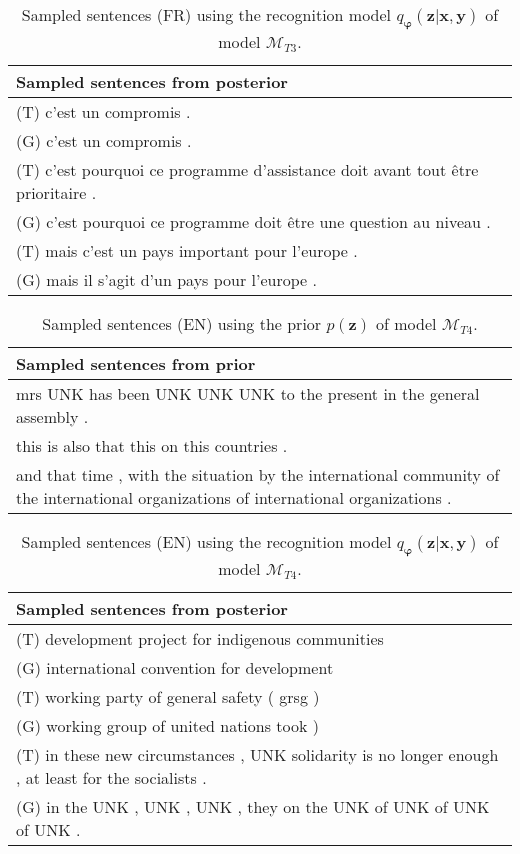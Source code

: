 \begin{table}
  \centering
  \begin{tabular}{|L{14cm}|} 
    \hline
    Sampled sentences from posterior\\ [0.5ex] 
    \hline\hline
    (T) c’est un compromis .\\
    (G) c’est un compromis .\\
    \hline
    (T) c'est pourquoi ce programme d'assistance doit avant tout être prioritaire .\\
    (G) c'est pourquoi ce programme doit être une question au niveau .\\
    \hline
    (T) mais c'est un pays important pour l'europe .\\
    (G) mais il s'agit d'un pays pour l'europe .\\
    \hline
  \end{tabular}
  \caption{Sampled sentences (FR) using the recognition model
    $q_{\bm{\varphi}}(\bm{z} | \bm{x}, \bm{y})$ of model $\mathcal{M}_{T3}$.}
\end{table}

\begin{table}
  \centering
  \begin{tabular}{|L{14cm}|} 
    \hline
    Sampled sentences from prior\\
    \hline\hline
    mrs UNK has been UNK UNK UNK to the present in the general assembly .\\
    \hline
    this is also that this on this countries .\\
    \hline
    and that time , with the situation by the international community of the international organizations of international organizations .\\
    \hline
  \end{tabular}
  \caption{Sampled sentences (EN) using the prior $p(\bm{z})$ of model $\mathcal{M}_{T4}$.}
\end{table}

\begin{table}
  \centering
  \begin{tabular}{|L{14cm}|} 
    \hline
    Sampled sentences from posterior\\ [0.5ex] 
    \hline\hline
    (T) development project for indigenous communities\\
    (G) international convention for development\\
    \hline
    (T) working party of general safety ( grsg )\\
    (G) working group of united nations took )\\
    \hline
    (T) in these new circumstances , UNK solidarity is no longer enough , at least for the socialists .\\
    (G) in the UNK , UNK , UNK , they on the UNK of UNK of UNK of UNK .\\
    \hline
  \end{tabular}
  \caption{Sampled sentences (EN) using the recognition model
    $q_{\bm{\varphi}}(\bm{z} | \bm{x}, \bm{y})$ of model $\mathcal{M}_{T4}$.}
\end{table}

